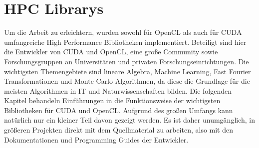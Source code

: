 	\chapter{HPC Librarys}	
	Um die Arbeit zu erleichtern, wurden sowohl für OpenCL als auch für CUDA umfangreiche High Performance Bibliotheken implementiert. Beteiligt sind hier die Entwickler von CUDA und OpenCL, eine große Community sowie Forschungsgruppen an Universitäten und privaten Forschungseinrichtungen. Die wichtigsten Themengebiete sind lineare Algebra, Machine Learning, Fast Fourier Transformationen und Monte Carlo Algorithmen, da diese die Grundlage für die meisten Algorithmen in IT und Naturwissenschaften bilden. Die folgenden Kapitel behandeln Einführungen in die Funktionsweise der wichtigsten Bibliotheken für CUDA und OpenCL. Aufgrund des großen Umfangs kann natürlich nur ein kleiner Teil davon gezeigt werden. Es ist daher unumgänglich, in größeren Projekten direkt mit dem Quellmaterial zu arbeiten, also mit den Dokumentationen und Programming Guides der Entwickler.
	\newpage	
	
	\startcontents[THRUST]
			
	\stopcontents[THRUST]
		
	\newpage
		
		
	\newpage
	
		
	\newpage
	

	\newpage
	
